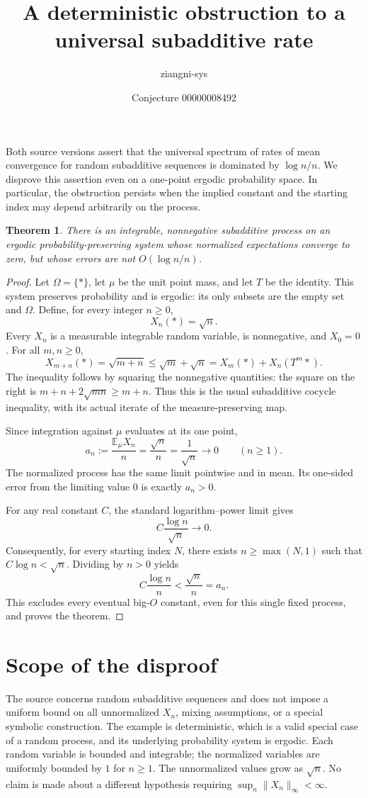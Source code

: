 \documentclass[11pt]{article}
\title{A deterministic obstruction to a universal subadditive rate}
\author{ziangni-sys}
\date{Conjecture 00000008492}
\newtheorem{theorem}{Theorem}
\begin{document}
\sloppy
\maketitle
\noindent Both source versions assert that the universal spectrum of rates of
mean convergence for random subadditive sequences is dominated by
$\log n/n$. We disprove this assertion even on a one-point ergodic probability
space. In particular, the obstruction persists when the implied constant and
the starting index may depend arbitrarily on the process.

\begin{theorem}
There is an integrable, nonnegative subadditive process on an ergodic
probability-preserving system whose normalized expectations converge to zero,
but whose errors are not $O(\log n/n)$.
\end{theorem}
\begin{proof}
Let $\Omega=\{*\}$, let $\mu$ be the unit point mass, and let $T$ be the
identity. This system preserves probability and is ergodic: its only subsets
are the empty set and $\Omega$. Define, for every integer $n\geq0$,
\[
 X_n(*)=\sqrt n.
\]
Every $X_n$ is a measurable integrable random variable, is nonnegative, and
$X_0=0$. For all $m,n\geq0$,
\[
 X_{m+n}(*)=\sqrt{m+n}\leq\sqrt m+\sqrt n
 =X_m(*)+X_n(T^m*).
\]
The inequality follows by squaring the nonnegative quantities: the square on
the right is $m+n+2\sqrt{mn}\geq m+n$. Thus this is the usual subadditive
cocycle inequality, with its actual iterate of the measure-preserving map.

Since integration against $\mu$ evaluates at its one point,
\[
 a_n:=\frac{\mathbb E_\mu X_n}{n}
     =\frac{\sqrt n}{n}=\frac1{\sqrt n}\longrightarrow0
 \qquad(n\geq1).
\]
The normalized process has the same limit pointwise and in mean. Its
one-sided error from the limiting value $0$ is exactly $a_n>0$.

For any real constant $C$, the standard logarithm--power limit gives
\[
 C\frac{\log n}{\sqrt n}\longrightarrow0.
\]
Consequently, for every starting index $N$, there exists $n\geq\max(N,1)$
such that $C\log n<\sqrt n$. Dividing by $n>0$ yields
\[
 C\frac{\log n}{n}<\frac{\sqrt n}{n}=a_n.
\]
This excludes every eventual big-$O$ constant, even for this single fixed
process, and proves the theorem.
\end{proof}

\newpage
\section*{Scope of the disproof}
The source concerns random subadditive sequences and does not impose a
uniform bound on all unnormalized $X_n$, mixing assumptions, or a special
symbolic construction. The example is deterministic, which is a valid
special case of a random process, and its underlying probability system is
ergodic. Each random variable is bounded and integrable; the normalized
variables are uniformly bounded by $1$ for $n\geq1$. The unnormalized values
grow as $\sqrt n$. No claim is made about a different hypothesis requiring
$\sup_n\|X_n\|_\infty<\infty$.
\end{document}
